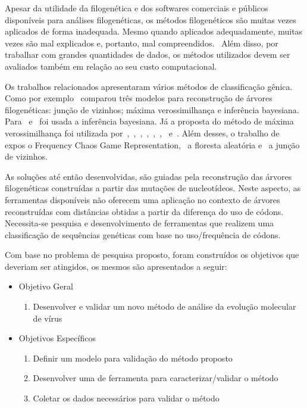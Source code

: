 Apesar da utilidade da filogenética e dos softwares comerciais e públicos disponíveis para análises filogenéticas, os métodos filogenéticos são muitas vezes aplicados de forma inadequada. Mesmo quando aplicados adequadamente, muitas vezes são mal explicados e, portanto, mal compreendidos.~\cite[p. 1]{barry_phylogenetic_analysis_2006} Além disso, por trabalhar com grandes quantidades de dados, os métodos utilizados devem ser avaliados também em relação ao seu custo computacional.

Os trabalhos relacionados apresentaram vários métodos de classificação gênica. Como por exemplo~\cite{dimitrov_updated_2019} comparou três modelos para reconstrução de árvores filogenéticas: junção de vizinhos; máxima verossimilhança e inferência bayesiana. Para~\cite{yin_systematic_2019} e~\cite{bedoya-pilozo_molecular_epidemiology_2018} foi usada a inferência bayesiana. Já a proposta do método de máxima verossimilhança foi utilizada por~\cite{fall_genetic_diversity_2021},~\cite{behl_threat_2022},~\cite{shabbir_comprehensive_2020},~\cite{hudu_hepatitis_2018},~\cite{sallard_tracing_2021},~\cite{paez-espino_diversity_evolution_2019},~\cite{tang_evolutionary_2021} e~\cite{cho_analysis_2022}. Além desses, o trabalho de~\cite{lichtblau_alignment-free_2019} expos o Frequency Chaos Game Representation,~\cite{kim_ngs_2022} a floresta aleatória e~\cite{potdar_phylogenetic_2021} a junção de vizinhos.

As soluções até então desenvolvidas, são guiadas pela reconstrução das árvores filogenéticas construídas a partir das mutações de nucleotídeos. Neste aspecto, as ferramentas disponíveis não oferecem uma aplicação no contexto de árvores reconstruídas com distâncias obtidas a partir da diferença do uso de códons. Necessita-se pesquisa e desenvolvimento de ferramentas que realizem uma classificação de sequências genéticas com base no uso/frequência de códons.

Com base no problema de pesquisa proposto, foram construídos os objetivos que deveriam ser atingidos, os mesmos são apresentados a seguir:
\begin{itemize}
  \item Objetivo Geral
    \begin{enumerate}[label=~(\roman*)]
      \item Desenvolver e validar um novo método de análise da evolução molecular de vírus
    \end{enumerate}
  \item Objetivos Específicos
    \begin{enumerate}[label=~(\roman*)]
      \item Definir um modelo para validação do método proposto
      \item Desenvolver uma de ferramenta para caracterizar/validar o método
      \item Coletar os dados necessários para validar o método
    \end{enumerate}
\end{itemize}

